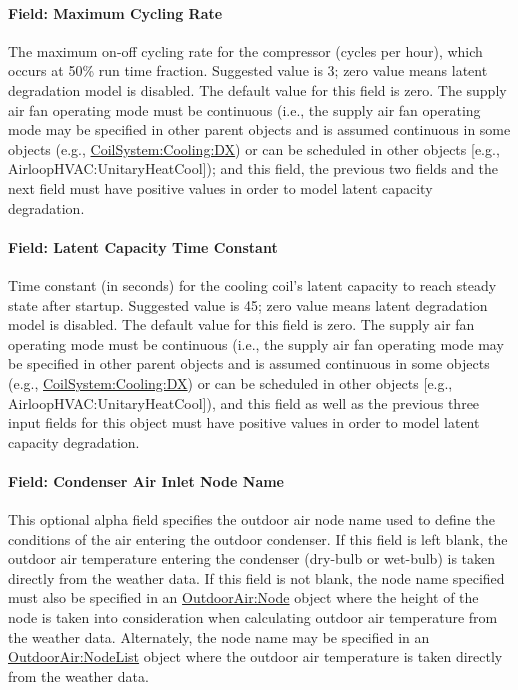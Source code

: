 \paragraph{Field: Maximum Cycling Rate}\label{field-maximum-cycling-rate-1}

The maximum on-off cycling rate for the compressor (cycles per hour), which occurs at 50\% run time fraction. Suggested value is 3; zero value means latent degradation model is disabled. The default value for this field is zero. The supply air fan operating mode must be continuous (i.e., the supply air fan operating mode may be specified in other parent objects and is assumed continuous in some objects (e.g., \hyperref[coilsystemcoolingdx]{CoilSystem:Cooling:DX}) or can be scheduled in other objects {[}e.g., AirloopHVAC:UnitaryHeatCool{]}); and this field, the previous two fields and the next field must have positive values in order to model latent capacity degradation.

\paragraph{Field: Latent Capacity Time Constant}\label{field-latent-capacity-time-constant-1}

Time constant (in seconds) for the cooling coil's latent capacity to reach steady state after startup. Suggested value is 45; zero value means latent degradation model is disabled. The default value for this field is zero. The supply air fan operating mode must be continuous (i.e., the supply air fan operating mode may be specified in other parent objects and is assumed continuous in some objects (e.g., \hyperref[coilsystemcoolingdx]{CoilSystem:Cooling:DX}) or can be scheduled in other objects {[}e.g., AirloopHVAC:UnitaryHeatCool{]}), and this field as well as the previous three input fields for this object must have positive values in order to model latent capacity degradation.

\paragraph{Field: Condenser Air Inlet Node Name}\label{field-condenser-air-inlet-node-name-4}

This optional alpha field specifies the outdoor air node name used to define the conditions of the air entering the outdoor condenser. If this field is left blank, the outdoor air temperature entering the condenser (dry-bulb or wet-bulb) is taken directly from the weather data. If this field is not blank, the node name specified must also be specified in an \hyperref[outdoorairnode]{OutdoorAir:Node} object where the height of the node is taken into consideration when calculating outdoor air temperature from the weather data. Alternately, the node name may be specified in an \hyperref[outdoorairnodelist]{OutdoorAir:NodeList} object where the outdoor air temperature is taken directly from the weather data.

